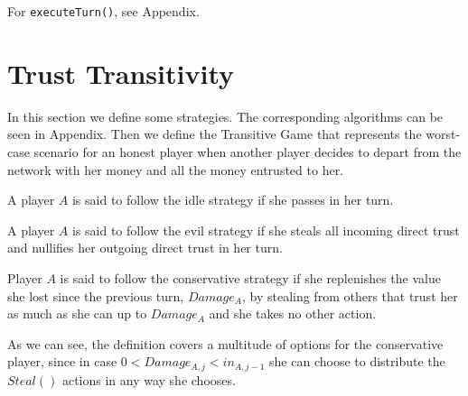 \documentclass[11pt]{llncs}
\makeatletter
\newcommand*\Suppressnumber{%
  \lst@AddToHook{OnNewLine}{%
    \let\thelstnumber\relax%
     \advance\c@lstnumber-\@ne\relax%
    }%
}
\theoremstyle{definition}
\makeatother
\begin{document}
    For \texttt{executeTurn()}, see Appendix.
  \section{Trust Transitivity}
     In this section we define some strategies. The corresponding algorithms can be seen in Appendix. Then we define the
     Transitive Game that represents the worst-case scenario for an honest player when another player decides to depart from
     the network with her money and all the money entrusted to her.
     \begin{definition}
        A player $A$ is said to follow the idle strategy if she passes in her turn. 
     \end{definition}
     \begin{definition}
        A player $A$ is said to follow the evil strategy if she steals all incoming direct trust and nullifies her outgoing
        direct trust in her turn.
     \end{definition}
     \begin{definition}
        Player $A$ is said to follow the conservative strategy if she replenishes the value she lost since the previous turn,
        $Damage_A$, by stealing from others that trust her as much as she can up to $Damage_A$ and she takes no other action.
     \end{definition}
     As we can see, the definition covers a multitude of options for the conservative player, since in case $0 < Damage_{A,j}
     < in_{A,j-1}$ she can choose to distribute the $Steal\left(\right)$ actions in any way she chooses.
\end{document}
